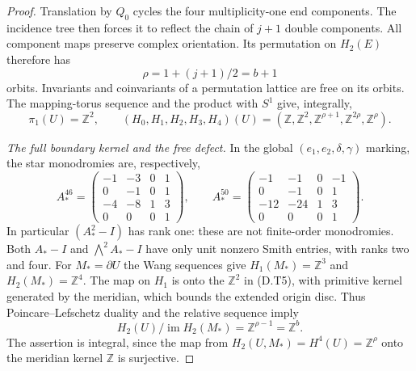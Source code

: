 \begin{proof}
Translation by $Q_0$ cycles the four multiplicity-one end
components. The incidence tree then forces it to reflect the
chain of $j+1$ double components. All component maps preserve
complex orientation. Its permutation on $H_2(E)$ therefore
has
\[
                  \rho=1+(j+1)/2=b+1
\]
orbits. Invariants and coinvariants of a permutation lattice
are free on its orbits. The mapping-torus sequence and the
product with $S^1$ give, integrally,
\[
 \pi_1(U)=\mathbb Z^2,\qquad
 (H_0,H_1,H_2,H_3,H_4)(U)
  =(\mathbb Z,\mathbb Z^2,\mathbb Z^{\rho+1},
                         \mathbb Z^{2\rho},\mathbb Z^\rho).
 \tag{D.T5}
\]

\emph{The full boundary kernel and the free defect.}
In the global $(e_1,e_2,\delta,\gamma)$ marking, the star
monodromies are, respectively,
\[
 A_*^{46}=\begin{pmatrix}
 -1&-3&0&1\\0&-1&0&1\\-4&-8&1&3\\0&0&0&1
 \end{pmatrix},\qquad
 A_*^{50}=\begin{pmatrix}
 -1&-1&0&-1\\0&-1&0&1\\-12&-24&1&3\\0&0&0&1
 \end{pmatrix}.
 \tag{D.T6}
\]
In particular $(A_*^2-I)$ has rank one: these are not
finite-order monodromies. Both $A_*-I$ and
$\bigwedge^2A_*-I$ have only unit nonzero Smith entries,
with ranks two and four. For $M_*=\partial U$ the Wang
sequences give $H_1(M_*)=\mathbb Z^3$ and
$H_2(M_*)=\mathbb Z^4$. The map on $H_1$ is onto the
$\mathbb Z^2$ in (D.T5), with primitive kernel generated
by the meridian, which bounds the extended origin disc.
Thus Poincare--Lefschetz duality and the relative sequence
imply
\[
 H_2(U)/\operatorname{im}H_2(M_*)=\mathbb Z^{\rho-1}
                                           =\mathbb Z^b.
 \tag{D.T7}
\]
The assertion is integral, since the map from
$H_2(U,M_*)=H^4(U)=\mathbb Z^\rho$ onto the meridian
kernel $\mathbb Z$ is surjective.


\end{proof}
